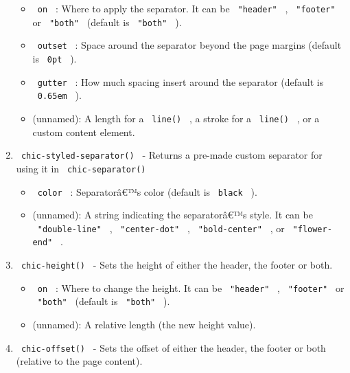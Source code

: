 \begin{enumerate}
  \begin{itemize}
  \tightlist
  \item
    \texttt{\ on\ } : Where to apply the separator. It can be
    \texttt{\ "header"\ } , \texttt{\ "footer"\ } or \texttt{\ "both"\ }
    (default is \texttt{\ "both"\ } ).
  \item
    \texttt{\ outset\ } : Space around the separator beyond the page
    margins (default is \texttt{\ 0pt\ } ).
  \item
    \texttt{\ gutter\ } : How much spacing insert around the separator
    (default is \texttt{\ 0.65em\ } ).
  \item
    (unnamed): A length for a \texttt{\ line()\ } , a stroke for a
    \texttt{\ line()\ } , or a custom content element.
  \end{itemize}
\item
  \texttt{\ chic-styled-separator()\ } - Returns a pre-made custom
  separator for using it in \texttt{\ chic-separator()\ }

  \begin{itemize}
  \tightlist
  \item
    \texttt{\ color\ } : Separatorâ€™s color (default is
    \texttt{\ black\ } ).
  \item
    (unnamed): A string indicating the separatorâ€™s style. It can be
    \texttt{\ "double-line"\ } , \texttt{\ "center-dot"\ } ,
    \texttt{\ "bold-center"\ } , or \texttt{\ "flower-end"\ } .
  \end{itemize}
\item
  \texttt{\ chic-height()\ } - Sets the height of either the header, the
  footer or both.

  \begin{itemize}
  \tightlist
  \item
    \texttt{\ on\ } : Where to change the height. It can be
    \texttt{\ "header"\ } , \texttt{\ "footer"\ } or \texttt{\ "both"\ }
    (default is \texttt{\ "both"\ } ).
  \item
    (unnamed): A relative length (the new height value).
  \end{itemize}
\item
  \texttt{\ chic-offset()\ } - Sets the offset of either the header, the
  footer or both (relative to the page content).


\end{enumerate}
